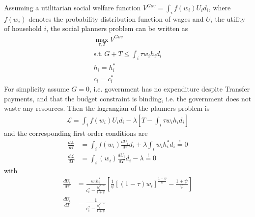 Assuming a utilitarian social welfare function
$V^{Gov} = \int_i f\left(w_i\right) U_i d_i $, where $f\left(w_i\right) $
denotes the probability distribution function of wages and $U_i$ the utility of
household $i$, the social planners problem can be written as
\begin{align*}
  \max_{\tau, T} V^{Gov} \\
  \text{s.t.} ~ G + T \leq \int_i \tau w_i h_i d_i \\
  h_i = h_i^* \\
  c_i = c_i^*
\end{align*}
For simplicity assume $G = 0$, i.e. government has no expenditure despite
Transfer payments, and that the budget constraint is binding, i.e. the
government does not waste any resources. Then the lagrangian of the planners
problem is
\begin{align*}
  \mathscr{L} = \int_i f\left(w_i\right) U_i d_i - \lambda \left[ T - \int_i \tau w_i
  h_i d_i \right]
\end{align*}
and the corresponding first order conditions are
\begin{align*}
  \frac{d \mathscr{L}}{d \tau } &= \int_i f\left(w_i\right) \frac{d U_i}{d \tau}
  d_i + \lambda \int_i w_i h_i^* d_i \overset{!}{=} 0 \\
  \frac{d \mathscr{L}}{d T} &= \int_i \left(w_i\right) \frac{d U_i}{d T} d_i -
  \lambda \overset{!}{=} 0
\end{align*}
with
\begin{align*}
  \frac{d U_i}{d \tau} &= \frac{w_i h_i^*}{c_i^* - \frac{h_i^{*^{1 + \psi}}}{1 +
  \psi}} \left[ \frac{1}{\psi} \left[ \left(1 - \tau\right) w_i 
  \right]^{\frac{1 - \psi}{\psi}} - \frac{1 + \psi}{\psi} \right] \\
  \frac{d U_i}{d T} &= \frac{1}{c_i^* - \frac{h_i^{*^{1 + \psi}}}{1 +
  \psi}}
\end{align*}